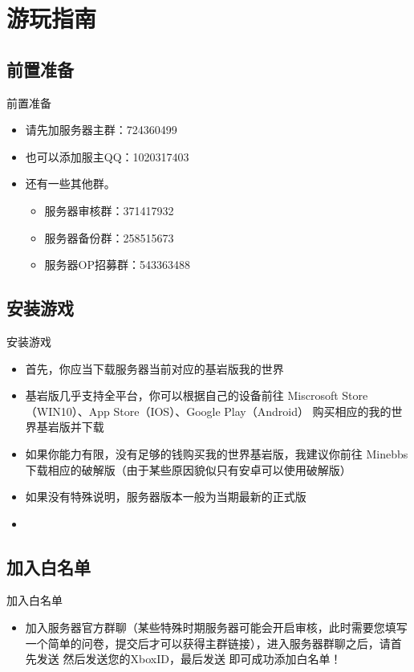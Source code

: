 \documentclass{beamer}
\begin{document}
\section{游玩指南}

\subsection{前置准备}
\begin{frame}{前置准备}
    \begin{itemize}
        \item 请先加服务器主群：724360499
        \item 也可以添加服主QQ：1020317403
        \item 还有一些其他群。
        \begin{itemize}
            \item 服务器审核群：371417932 
            \item 服务器备份群：258515673 
            \item 服务器OP招募群：543363488
        \end{itemize}
    \end{itemize}
\end{frame}

\subsection{安装游戏}
\begin{frame}{安装游戏}
    \begin{itemize}[<+-| alert@+>]
        \item 首先，你应当下载服务器当前对应的基岩版我的世界
        \item 基岩版几乎支持全平台，你可以根据自己的设备前往 Miscrosoft Store（WIN10）、App Store（IOS）、Google Play（Android） 购买相应的我的世界基岩版并下载
        \item 如果你能力有限，没有足够的钱购买我的世界基岩版，我建议你前往 Minebbs 下载相应的破解版（由于某些原因貌似只有安卓可以使用破解版）
        \item 如果没有特殊说明，服务器版本一般为当期最新的正式版
        \item \href{https://mc.minebbs.com/\#/}{\color{purple}{点这里到 Minebbs 下载！}}
    \end{itemize}
\end{frame}

\subsection{加入白名单}
\begin{frame}{加入白名单}
    \begin{itemize}
        \item 加入服务器官方群聊（某些特殊时期服务器可能会开启审核，此时需要您填写一个简单的问卷，提交后才可以获得主群链接），进入服务器群聊之后，请首先发送 \color{purple}{“\#申请白名”} 然后发送您的XboxID，最后发送 \color{purple}{“\#确定”} 即可成功添加白名单！
    \end{itemize}
\end{frame}
\end{document}
